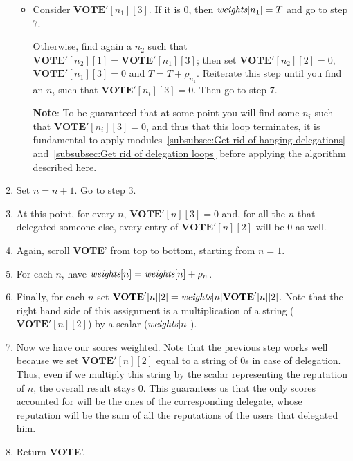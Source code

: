 \documentclass[submission, copyright,creativecommons,sharealike,noncommercial]{eptcs}
\newcommand{\Vote}{\textbf{VOTE}\xspace}
\begin{document}
\begin{enumerate}
\begin{itemize}
			\item Consider $\Vote'[n_1][3]$. If it is $0$, then $\emph{weights}[n_1] = T$ and go to step $7$. 
			
			Otherwise, find again a $n_2$ such that $\Vote'[n_2][1] = \Vote'[n_1][3]$; then set $\Vote'[n_2][2] = 0$, $\Vote'[n_1][3] = 0$ and $T = T + \rho_{n_1}$. Reiterate this step until 
			you find an $n_i$ such that $\Vote'[n_i][3]=0$. Then go to step $7$.
			
			\textbf{Note}: To be guaranteed that at some point you will find some $n_i$ such that $\Vote'[n_i][3]=0$, and thus that this loop terminates, it is fundamental to apply modules~\ref{subsubsec:Get rid of hanging delegations} and~\ref{subsubsec:Get rid of delegation loops} before applying the algorithm described here.
		\end{itemize}
	
		\item Set $n=n+1$. Go to step $3$.
	
		\item At this point, for every $n$, $\Vote'[n][3]=0$ and, for all the $n$ that delegated someone else, every entry of $\Vote'[n][2]$ will be $0$ as well.
	
		\item Again, scroll \Vote' from top to bottom, starting from $n=1$.
	
		\item For each $n$, have $\emph{weights}[n] = \emph{weights}[n] + \rho_n$.
	
		\item Finally, for each $n$ set $\Vote'[n][2] = \emph{weights}[n] \Vote'[n][2]$. Note that the right hand side of this assignment is a multiplication of a string ($\Vote'[n][2]$) by a scalar ($ \emph{weights}[n]$).
		
		\item Now we have our scores weighted. Note that the previous step works well because we set $\Vote'[n][2]$ equal to a string of $0$s in case of delegation. Thus, even if we multiply this string by the scalar representing the reputation of $n$, the overall result stays $0$. This guarantees us that the only scores accounted for will be the ones of the corresponding delegate, whose reputation will be the sum of all the reputations of the users that delegated him.
		
		\item Return \Vote'.
	\end{enumerate}
\end{document}
